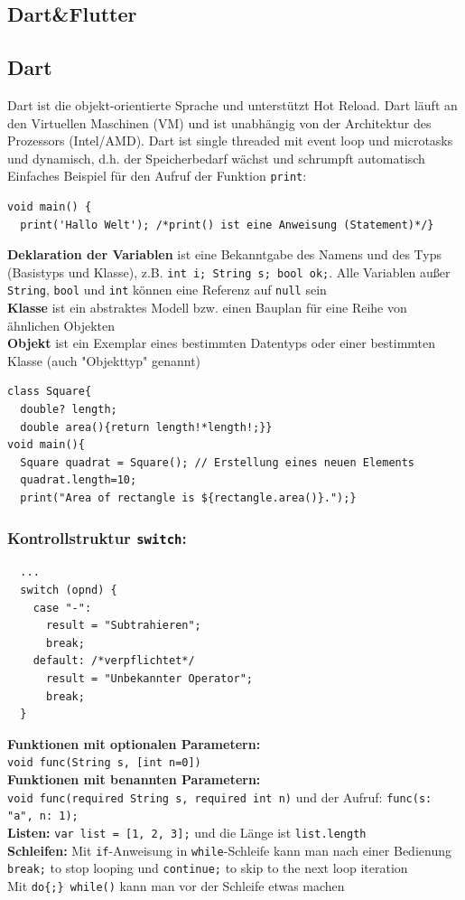 \documentclass[12pt,landscape]{article}
\def\code#1{\texttt{#1}} %
\begin{document}
\begin{multicols}{3}
\section{Dart\&Flutter}
\subsection{Dart}
Dart ist die objekt-orientierte Sprache und unterstützt Hot Reload. Dart läuft an den Virtuellen Maschinen (VM) und ist unabhängig von der Architektur des Prozessors (Intel/AMD). Dart ist single threaded mit event loop und microtasks und dynamisch, d.h. der Speicherbedarf wächst und schrumpft automatisch\\
Einfaches Beispiel für den Aufruf der Funktion \code{print}:
\begin{lstlisting}
void main() {
  print('Hallo Welt'); /*print() ist eine Anweisung (Statement)*/}
\end{lstlisting}
\textbf{Deklaration der Variablen} ist eine Bekanntgabe des Namens und des Typs (Basistyps und Klasse), z.B. \code{int i; String s; bool ok;}. Alle Variablen außer \code{String}, \code{bool} und \code{int} können eine Referenz auf \code{null} sein\\
\textbf{Klasse} ist ein abstraktes Modell bzw. einen Bauplan für eine Reihe von ähnlichen Objekten\\
\textbf{Objekt} ist ein Exemplar eines bestimmten Datentyps oder einer bestimmten Klasse (auch "Objekttyp" genannt)\\
\begin{lstlisting}
class Square{
  double? length;
  double area(){return length!*length!;}}
void main(){
  Square quadrat = Square(); // Erstellung eines neuen Elements 
  quadrat.length=10;
  print("Area of rectangle is ${rectangle.area()}.");}
\end{lstlisting}
\subsubsection{Kontrollstruktur \code{switch}:}
\begin{lstlisting}
  ...
  switch (opnd) {
    case "-":
      result = "Subtrahieren";
      break;
    default: /*verpflichtet*/
      result = "Unbekannter Operator";
      break;
  }
\end{lstlisting}

\textbf{Funktionen mit optionalen Parametern:}\\
\code{void func(String 
s, [int n=0])}\\
\textbf{Funktionen mit benannten Parametern:}\\
\code{void func({required String s, required int n})} und der Aufruf: \code{func(s: "a", n: 1);}\\
\textbf{Listen:} \code{var list = [1, 2, 3];} und die Länge ist \code{list.length}\\
\textbf{Schleifen:} Mit \code{if}-Anweisung in \code{while}-Schleife kann man nach einer Bedienung \code{break;} to stop looping und \code{continue;} to skip to the next loop iteration\\
Mit \code{do\{;\} while()} kann man vor der Schleife etwas machen

\end{multicols}
\end{document}

